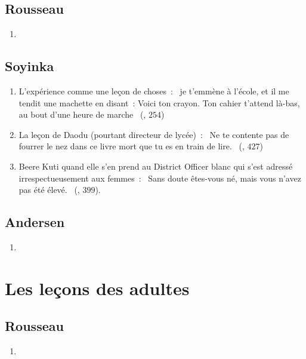 \documentclass[a4paper, 11pt, hidelinks]{article}
\newcommand{\rb}[1]{\Romanbar{#1}}
\begin{document}
\subsection{Rousseau}

\begin{enumerate}
    \item 
\end{enumerate}


\subsection{Soyinka}


\begin{enumerate}
    \item L’expérience comme une leçon de choses : \og{} je t’emmène à l’école, et il me tendit une machette en disant : Voici ton crayon. Ton cahier t’attend là-bas, au bout d’une heure de marche \fg{} (\rb{9}, $254$)
    \item La leçon de Daodu (pourtant directeur de lycée) : \og{} Ne te contente pas de fourrer le nez dans ce livre mort que tu es en train de lire. \fg{} (\rb{15}, $427$)
    \item Beere Kuti quand elle s’en prend au District Officer blanc qui s’est adressé irrespectueusement aux femmes : \og{} Sans doute êtes-vous né, mais vous n’avez pas été élevé. \fg{} (\rb{14}, $399$).
    
\end{enumerate}


\subsection{Andersen}


\begin{enumerate}
    \item 
\end{enumerate}



\section{Les leçons des adultes}



\subsection{Rousseau}

\begin{enumerate}
    \item 
\end{enumerate}
\end{document}
